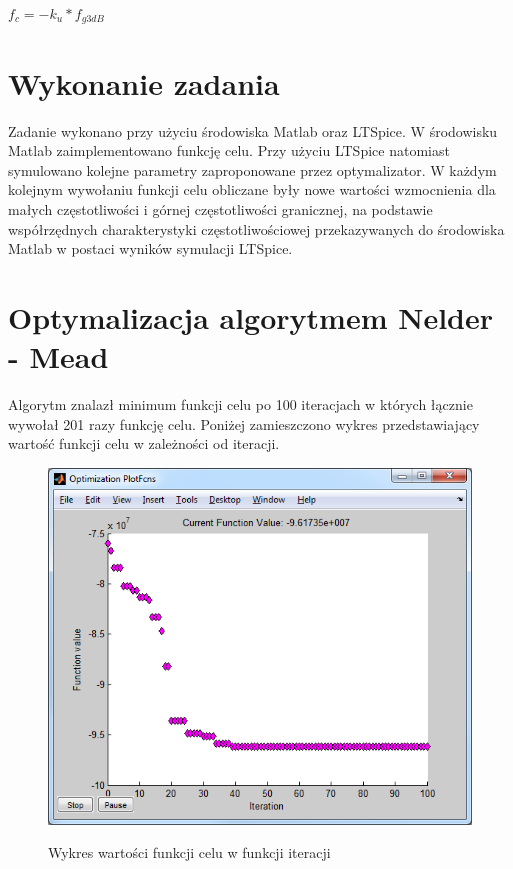 \documentclass[10pt,a4paper]{article}
\begin{document}
$ f_c = -k_u * f_{g3dB} $

\section{Wykonanie zadania}

Zadanie wykonano przy użyciu środowiska Matlab oraz LTSpice. W środowisku Matlab zaimplementowano funkcję celu. Przy użyciu LTSpice natomiast symulowano kolejne parametry zaproponowane przez optymalizator. W każdym kolejnym wywołaniu funkcji celu obliczane były nowe wartości wzmocnienia dla małych częstotliwości i górnej częstotliwości granicznej, na podstawie współrzędnych charakterystyki częstotliwościowej przekazywanych do środowiska Matlab w postaci wyników symulacji LTSpice.

\section{Optymalizacja algorytmem Nelder - Mead}

Algorytm znalazł minimum funkcji celu po 100 iteracjach w których łącznie wywołał 201 razy funkcję celu.
Poniżej zamieszczono wykres przedstawiający wartość funkcji celu w zależności od iteracji.

\begin{figure}[H]
  \caption{Wykres wartości funkcji celu w funkcji iteracji}
  \centering
\includegraphics[scale=0.7]{obrazki/NF.png}
  \label{fig:schemat_tran}
\end{figure}
\end{document}
